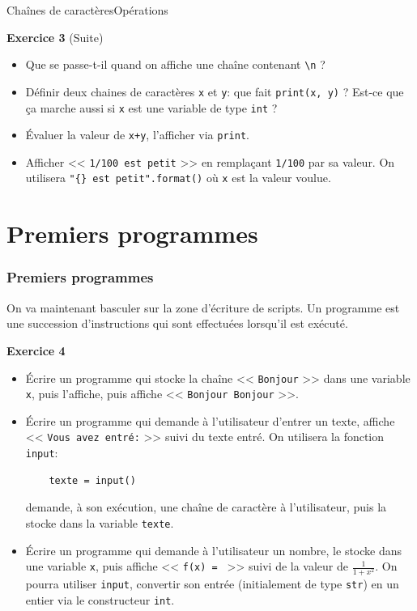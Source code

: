 \documentclass[10pt]{beamer}
\begin{document}
\begin{frame}[fragile]{Chaînes de caractères}{Opérations}


	\begin{block}{\textbf{Exercice 3} (Suite)}
    \begin{itemize}[<+->]
	
	
	\item Que se passe-t-il quand on affiche une chaîne contenant \verb|\n| ?
	
	\item Définir deux chaines de caractères \verb|x| et \verb|y|: que fait \verb|print(x, y)| ? Est-ce que ça marche aussi si \verb|x| est une variable de type \verb|int| ?
	
	\item Évaluer la valeur de \verb|x+y|, l'afficher via \verb|print|.
	
	\item Afficher << \verb|1/100 est petit| >> en remplaçant \verb|1/100| par sa valeur. On utilisera \verb|"{} est petit".format()| où \verb|x| est la valeur voulue.
	
	\end{itemize}
	\end{block}
\end{frame}

\section{Premiers programmes}

\begin{frame}[fragile]
	\frametitle{Premiers programmes}
	
	On va maintenant basculer sur la zone d'écriture de scripts. Un programme est une succession d'instructions qui sont effectuées lorsqu'il est exécuté.
	\pause
	
	\begin{block}{\textbf{Exercice 4}}
	\begin{itemize}[<+->]
	\item Écrire un programme qui stocke la chaîne << \verb|Bonjour| >> dans une variable \verb|x|, puis l'affiche, puis affiche << \verb|Bonjour Bonjour| >>.
	
	\item Écrire un programme qui demande à l'utilisateur d'entrer un texte, affiche << \verb|Vous avez entré:| >> suivi du texte entré. On utilisera la fonction \verb|input|:	
	\begin{lstlisting}
	texte = input()
	\end{lstlisting}
	demande, à son exécution, une chaîne de caractère à l'utilisateur, puis la stocke dans la variable \verb|texte|.
	
	\item Écrire un programme qui demande à l'utilisateur un nombre, le stocke dans une variable \verb|x|, puis affiche << \verb|f(x) = | >> suivi de la valeur de $\frac{1}{1+x^2}$. On pourra utiliser \verb|input|, convertir son entrée (initialement de type \verb|str|) en un entier via le constructeur \verb|int|.
	
	\end{itemize}
	\end{block}
\end{frame}
\end{document}
